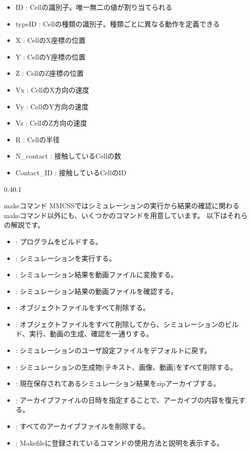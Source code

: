 \documentclass[vipdfmx,a4paper,11pt]{jsarticle}
\makeatletter
\renewcommand{\subsection}{%
  \@startsection{subsection}{1}{\z@}%
  {0.4\Cvs}{0.1\Cvs}%
  {\normalfont\large\headfont\raggedright}}
\makeatother
\begin{document}
\begin{itemize}
  \item ID : Cellの識別子。唯一無二の値が割り当てられる
  \item typeID : Cellの種類の識別子。種類ごとに異なる動作を定義できる
  \item X : CellのX座標の位置
  \item Y : CellのY座標の位置
  \item Z : CellのZ座標の位置
  \item Vx : CellのX方向の速度
  \item Vy : CellのY方向の速度
  \item Vz : CellのZ方向の速度
  \item R : Cellの半径
  \item N\_contact : 接触しているCellの数
  \item Contact\_ID : 接触しているCellのID
\end{itemize}

\subsection{makeコマンド}\label{make}
MMCSSではシミュレーションの実行から結果の確認に関わるmakeコマンド以外にも、いくつかのコマンドを用意しています。
以下はそれらの解説です。

\begin{itemize}
  \item {} : プログラムをビルドする。
  \item {} : シミュレーションを実行する。
  \item {} : シミュレーション結果を動画ファイルに変換する。
  \item {} : シミュレーション結果の動画ファイルを確認する。
  \item {} : オブジェクトファイルをすべて削除する。
  \item {} : オブジェクトファイルをすべて削除してから、シミュレーションのビルド、実行、動画の生成、確認を一通りする。
  \item {} : シミュレーションのユーザ設定ファイルをデフォルトに戻す。
  \item {} : シミュレーションの生成物(テキスト、画像、動画)をすべて削除する。
  \item {} : 現在保存されてあるシミュレーション結果をzipアーカイブする。
  \item {} : アーカイブファイルの日時を指定することで、アーカイブの内容を復元する。
  \item {} : すべてのアーカイブファイルを削除する。
  \item {} : Makefileに登録されているコマンドの使用方法と説明を表示する。
\end{itemize}
\end{document}
